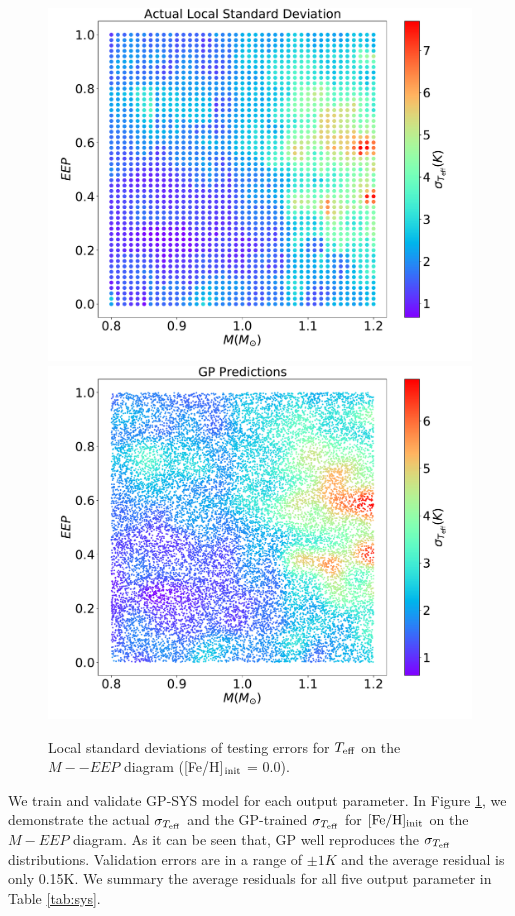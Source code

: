 \begin{figure}
	\includegraphics[width=1.0\columnwidth]{5d_sys_teff.pdf}
	\includegraphics[width=1.0\columnwidth]{5d_sys_effective_T_std_predictions.pdf}
    \caption{Local standard deviations of testing errors for $T_{\rm eff}$ on the $M -- EEP$ diagram ([Fe/H]$_{\rm init}$ = 0.0). } 
  \label{fig:5d_sys_teff}
\end{figure}

We train and validate GP-SYS model for each output parameter. In Figure \ref{fig:5d_sys_teff}, we demonstrate the actual $\sigma_{T_{\rm eff}}$ and the GP-trained $\sigma_{T_{\rm eff}}$ for $\rm [Fe/H]_{init}$ on the $M-EEP$ diagram.  As it can be seen that, GP well reproduces the $\sigma_{T_{\rm eff}}$ distributions. Validation errors are in a range of $\pm1K$ and the average residual is only 0.15K. We summary the average residuals for all five output parameter in Table \ref{tab:sys}.

